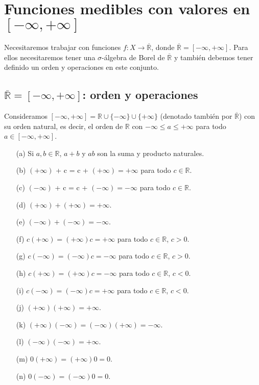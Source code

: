 \section{Funciones medibles con valores en $[-\infty, +\infty]$}
Necesitaremos trabajar con funciones $f: X \longrightarrow \overline{\mathbb{R}}$, donde $\overline{\mathbb{R}} = [-\infty, +\infty]$. Para ellos necesitaremos tener una $\sigma$-álgebra de Borel de $\overline{\mathbb{R}}$ y también debemos tener definido un orden y operaciones en este conjunto.

\subsection{$\overline{\mathbb{R}} = [-\infty,+\infty]$: orden y operaciones}
Consideramos $[-\infty, +\infty] = \mathbb{R} \cup \{ -\infty\} \cup \{+\infty\}$ (denotado también por $\overline{\mathbb{R}}$) con su orden natural, es decir, el orden de $\mathbb{R}$ con $-\infty \leq a \leq +\infty$ para todo $a \in [-\infty, +\infty]$.
\begin{defi}
    \begin{enumerate}
        \item[(a)] Si $a,b \in \mathbb{R}$, $a+b$ y $ab$ son la suma y producto naturales.
        \item[(b)] $(+\infty)$ + c = c + $(+\infty) = +\infty$ para todo $c \in \mathbb{R}$.
        \item[(c)] $(-\infty)$ + c = c + $(-\infty) = -\infty$ para todo $c \in \mathbb{R}$.
        \item[(d)] $(+\infty) +  (+ \infty) = +\infty $.
        \item[(e)] $(-\infty) +  (- \infty) = -\infty $.
        \item[(f)] $c(+\infty) = (+\infty)c = +\infty$ para todo $c \in \mathbb{R}$, $c > 0$.
        \item[(g)] $c(-\infty) = (-\infty)c = -\infty$ para todo $c \in \mathbb{R}$, $c > 0$.
        \item[(h)] $c(+\infty) = (+\infty)c = -\infty$ para todo $c \in \mathbb{R}$, $c < 0$.
        \item[(i)] $c(-\infty) = (-\infty)c = +\infty$ para todo $c \in \mathbb{R}$, $c < 0$.
        \item[(j)] $(+\infty)(+\infty) = +\infty$.
        \item[(k)] $(+\infty)(-\infty) = (-\infty)(+\infty) = -\infty$.
        \item[(l)] $(-\infty)(-\infty) = +\infty$.
        \item[(m)] $0(+\infty) = (+\infty)0 = 0$.
        \item[(n)] $0(-\infty) = (-\infty)0 = 0$.
    \end{enumerate}
\end{defi}

